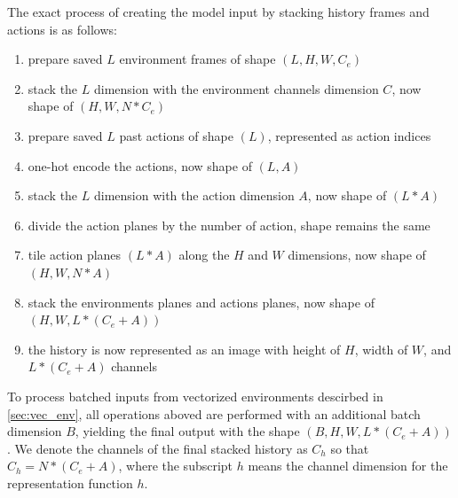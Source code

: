 \documentclass[12pt]{article}
\begin{document}
The exact process of creating the model input by stacking history frames and actions is as follows:
\begin{enumerate}
    \item prepare saved $L$ environment frames of shape $(L, H, W, C_e)$
    \item stack the $L$ dimension with the environment channels dimension $C$, now shape of $(H, W, N * C_e)$
    \item prepare saved $L$ past actions of shape $(L)$, represented as action indices
    \item one-hot encode the actions, now shape of $(L, A)$
    \item stack the $L$ dimension with the action dimension $A$, now shape of $(L * A)$
    \item divide the action planes by the number of action, shape remains the same
    \item tile action planes $(L * A)$ along the $H$ and $W$ dimensions, now shape of $(H, W, N * A)$
    \item stack the environments planes and actions planes, now shape of $(H, W, L * (C_e + A))$
    \item the history is now represented as an image with height of $H$, width of $W$, and $L * (C_e + A)$ channels
\end{enumerate}
To process batched inputs from vectorized environments descirbed in \ref{sec:vec_env}, all operations aboved are performed with an additional batch dimension $B$, yielding the final output with the shape $(B, H, W, L * (C_e + A))$.
We denote the channels of the final stacked history as $C_h$ so that $C_h = N * (C_e + A)$, where the subscript $h$ means the channel dimension for the representation function $h$.


\end{document}
